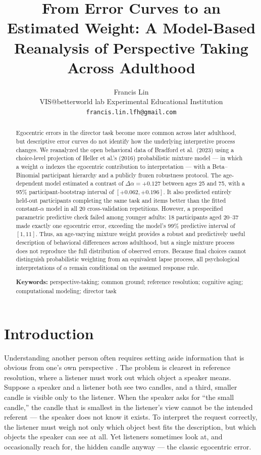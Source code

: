 \documentclass[11pt]{article}
\title{From Error Curves to an Estimated Weight:
A Model-Based Reanalysis of Perspective Taking Across Adulthood}
\author{Francis Lin\\{\small VIS@betterworld lab Experimental Educational Institution}\\{\small \texttt{francis.lin.lfh@gmail.com}}}
\date{}
\newcommand{\dalpha}{\ensuremath{\Delta\alpha}}
\begin{document}
\maketitle

\begin{abstract}
\noindent Egocentric errors in the director task become more common across later
adulthood, but descriptive error curves do not identify how the underlying
interpretive process changes. We reanalyzed the open behavioral data of Bradford
et al.\ (2023) using a choice-level projection of Heller et al.'s (2016)
probabilistic mixture model --- in which a weight $\alpha$ indexes the
egocentric contribution to interpretation --- with a Beta--Binomial participant
hierarchy and a publicly frozen robustness protocol. The age-dependent model
estimated a contrast of $\dalpha = +0.127$ between ages 25 and 75, with a 95\%
participant-bootstrap interval of $[+0.062, +0.196]$. It also predicted entirely
held-out participants completing the same task and items better than the fitted
constant-$\alpha$ model in all 20 cross-validation repetitions. However, a
prespecified parametric predictive check failed among younger adults: 18
participants aged 20--37 made exactly one egocentric error, exceeding the
model's 99\% predictive interval of $[1, 11]$. Thus, an age-varying mixture
weight provides a robust and predictively useful description of behavioral
differences across adulthood, but a single mixture process does not reproduce
the full distribution of observed errors. Because final choices cannot
distinguish probabilistic weighting from an equivalent lapse process, all
psychological interpretations of $\alpha$ remain conditional on the assumed
response rule.

\medskip
\noindent\textbf{Keywords:} perspective-taking; common ground; reference
resolution; cognitive aging; computational modeling; director task
\end{abstract}

\section{Introduction}\label{sec:intro}

Understanding another person often requires setting aside information that is
obvious from one's own perspective \citep{samuel2025}. The problem is clearest in
reference resolution, where a listener must work out which object a speaker
means. Suppose a speaker and a listener both see two candles, and a third,
smaller candle is visible only to the listener. When the speaker asks for ``the
small candle,'' the candle that is smallest in the listener's view cannot be the
intended referent --- the speaker does not know it exists. To interpret the
request correctly, the listener must weigh not only which object best fits the
description, but which objects the speaker can see at all. Yet listeners
sometimes look at, and occasionally reach for, the hidden candle anyway
\citep{keysar2000} --- the classic egocentric error.
\end{document}
